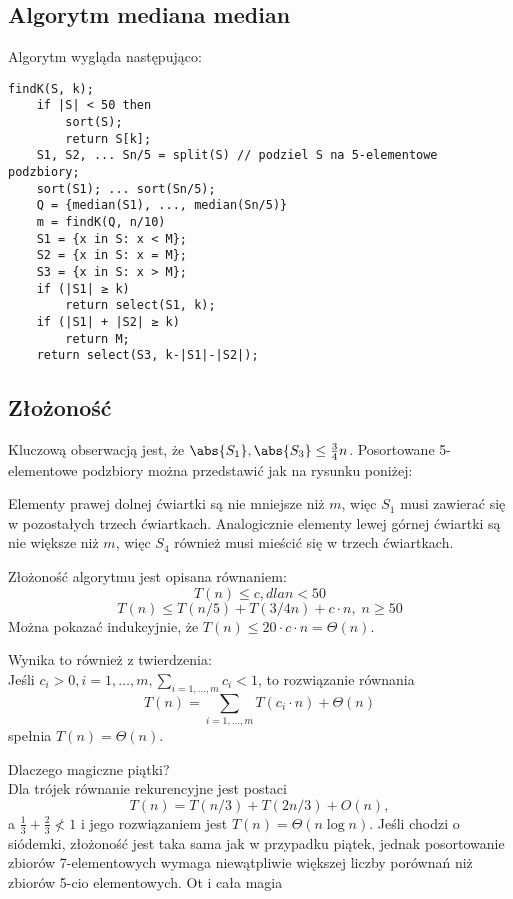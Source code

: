 \subsection{Algorytm mediana median}
Algorytm wygląda następująco:
\begin{verbatim}
findK(S, k);
    if |S| < 50 then
        sort(S);
        return S[k];
    S1, S2, ... Sn/5 = split(S) // podziel S na 5-elementowe podzbiory;
    sort(S1); ... sort(Sn/5);
    Q = {median(S1), ..., median(Sn/5)}
    m = findK(Q, n/10)
    S1 = {x in S: x < M};
    S2 = {x in S: x = M};
    S3 = {x in S: x > M};
    if (|S1| ≥ k)
        return select(S1, k);
    if (|S1| + |S2| ≥ k)
        return M;
    return select(S3, k-|S1|-|S2|);
\end{verbatim}


\subsection{Złożoność}
Kluczową obserwacją jest, że \( \abs{S_1}, \abs{S_3} \leq \frac{3}{4}n \).
Posortowane 5-elementowe podzbiory można przedstawić jak na rysunku poniżej:
\begin{figure}[H]
    \centering
    
\end{figure}
Elementy prawej dolnej ćwiartki są nie mniejsze niż \( m \), więc \( S_1 \) musi zawierać się w pozostałych trzech ćwiartkach. 
Analogicznie elementy lewej górnej ćwiartki są nie większe niż \( m \), więc \( S_4 \) również musi mieścić się w trzech ćwiartkach. 

Złożoność algorytmu jest opisana równaniem:
\[ T(n) \leq c, dla n < 50 \]
\[ T(n) \leq T(n/5) + T(3/4 n) + c \cdot n,\; n \geq 50 \]
Można pokazać indukcyjnie, że \( T(n) \leq 20 \cdot c \cdot n = \Theta(n) \).

Wynika to również z twierdzenia: \\
Jeśli \( c_i > 0, i = 1, \dots, m, \sum_{i=1, \dots, m} c_i < 1 \), to rozwiązanie
równania
\[ T(n) =\sum_{i=1, \dots, m} T(c_i \cdot n) + \Theta(n) \]
spełnia \( T(n) = \Theta(n) \).

Dlaczego magiczne piątki? \\
Dla trójek równanie rekurencyjne jest postaci
\[ T(n) = T(n/3) + T(2n/3) + O(n), \]
a \( \frac{1}{3} + \frac{2}{3} \not< 1 \) i jego rozwiązaniem jest \( T(n) = \Theta(n \log n) \).
Jeśli chodzi o siódemki, złożoność jest taka sama jak w przypadku piątek, jednak posortowanie zbiorów 7-elementowych wymaga niewątpliwie większej liczby porównań niż zbiorów 5-cio elementowych.
Ot i cała magia